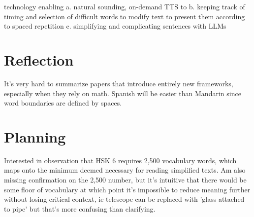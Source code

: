 \documentclass[
	letterpaper, %
]{jdf}
\begin{document}
technology enabling
a. natural sounding, on-demand TTS to
b. keeping track of timing and selection of difficult words to modify text to present them according to spaced repetition
c. simplifying and complicating sentences with LLMs

\section{Reflection}
It's very hard to summarize papers that introduce entirely new frameworks, especially when they rely on math.
Spanish will be easier than Mandarin since word boundaries are defined by spaces.

\section{Planning}

Interested in observation that HSK 6 requires 2,500 vocabulary words, which maps onto the minimum deemed necessary for reading simplified texts. Am also missing confirmation on the 2,500 number, but it's intuitive that there would be some floor of vocabulary at which point it's impossible to reduce meaning further without losing critical context, ie telescope can be replaced with 'glass attached to pipe' but that's more confusing than clarifying.


\printbibliography{}
\end{document}
